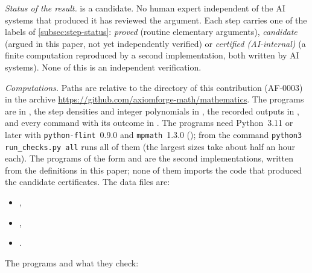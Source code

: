 \sloppy

\emph{Status of the result.}  is a candidate. No human expert independent of the
AI systems that produced it has reviewed the argument. Each step carries one of the labels of
\cref{subsec:step-status}: \emph{proved} (routine elementary arguments), \emph{candidate}
(argued in this paper, not yet independently verified) or \emph{certified (AI-internal)} (a finite
computation reproduced by a second implementation, both written by AI systems). None of this is
an independent verification.

\emph{Computations.} Paths are relative to the directory of this contribution (AF-0003) in the
archive \url{https://github.com/axiomforge-math/mathematics}. The programs are in
, the step densities and integer polynomials in
, the recorded outputs in ,
and every command with its outcome in . The programs need Python~3.11
or later with \texttt{python-flint}~0.9.0 and \texttt{mpmath}~1.3.0
(); from  the command
\texttt{python3 run\_checks.py all} runs all of them (the largest sizes take about half an hour
each). The programs of the form  and  are the second
implementations, written from the definitions in this paper; none of them imports the code that
produced the candidate certificates. The data files are:
\begin{itemize}
\item {},
\item {},
\item {}.
\end{itemize}
The programs and what they check:
